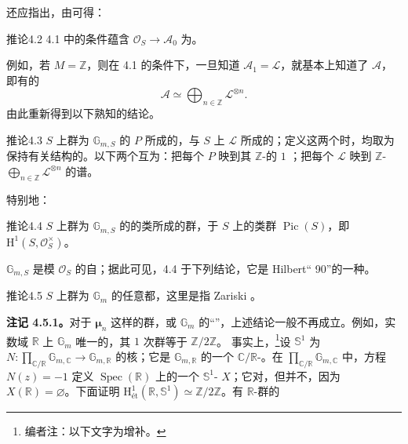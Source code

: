 还应指出，由可得：
\begin{SGAresult}{推论}{4.2}
4.1 中的条件蕴含 $\mathcal O_S\to\mathcal A_0$ 为。
\end{SGAresult}
例如，若 $M=\mathbb Z$，则在 4.1 的条件下，一旦知道 $\mathcal A_1=\mathcal L$，就基本上知道了 $\mathcal A$，即有的
\[
\mathcal A\simeq\bigoplus_{n\in\mathbb Z}\mathcal L^{\otimes n}.
\]
由此重新得到以下熟知的结论。
\begin{SGAresult}{推论}{4.3}
$S$ 上群为 $\mathbb G_{m,S}$ 的 $P$ 所成的，与 $S$ 上 $\mathcal L$ 所成的；定义这两个时，均取为保持有关结构的。以下两个互为：把每个 $P$ 映到其 $\mathbb Z$-的 $1$ ；把每个 $\mathcal L$ 映到 $\mathbb Z$- $\bigoplus_{n\in\mathbb Z}\mathcal L^{\otimes n}$ 的谱。
\end{SGAresult}
特别地：
\begin{SGAresult}{推论}{4.4}
$S$ 上群为 $\mathbb G_{m,S}$ 的的类所成的群，于 $S$ 上的类群 $\operatorname{Pic}(S)$，即 $\mathrm H^1(S,\mathcal O_S^\times)$。
\end{SGAresult}
$\mathbb G_{m,S}$ 是模 $\mathcal O_S$ 的自；据此可见，4.4 于下列结论，它是 Hilbert“ 90”的一种。
\begin{SGAresult}{推论}{4.5}
$S$ 上群为 $\mathbb G_m$ 的任意都，这里是指 Zariski 。
\end{SGAresult}
\textbf{注记 4.5.1。}对于 $\boldsymbol\mu_n$ 这样的群，或 $\mathbb G_m$ 的“”，上述结论一般不再成立。例如，实数域 $\mathbb R$ 上 $\mathbb G_m$ 唯一的，其 $1$ 次群等于 $\mathbb Z/2\mathbb Z$。
事实上，\footnote[14]{编者注：以下文字为增补。}设 $\mathbb S^1$ 为 $N:\prod_{\mathbb C/\mathbb R}\mathbb G_{m,\mathbb C}\to\mathbb G_{m,\mathbb R}$ 的核；它是 $\mathbb G_{m,\mathbb R}$ 的一个 $\mathbb C/\mathbb R$-。在 $\prod_{\mathbb C/\mathbb R}\mathbb G_{m,\mathbb C}$ 中，方程 $N(z)=-1$ 定义 $\operatorname{Spec}(\mathbb R)$ 上的一个 $\mathbb S^1$- $X$；它对，但并不，因为 $X(\mathbb R)=\varnothing$。下面证明 $\mathrm H^1_{\text{ét}}(\mathbb R,\mathbb S^1)\simeq\mathbb Z/2\mathbb Z$。有 $\mathbb R$-群的
